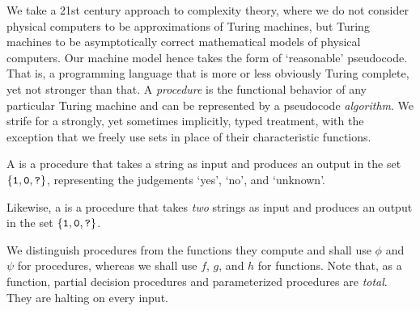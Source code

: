 We take a 21st century approach to complexity theory, where we do not consider physical computers to be approximations of Turing machines, but Turing machines to be asymptotically correct mathematical models of physical computers.
Our machine model hence takes the form of `reasonable' pseudocode.
That is, a programming language that is more or less obviously Turing complete, yet not stronger than that.
A \emph{procedure} is the functional behavior of any particular Turing machine and can be represented by a pseudocode \emph{algorithm}.
We strife for a strongly, yet sometimes implicitly, typed treatment, with the exception that we freely use sets in place of their characteristic functions.

\begin{definition}
  A  is a procedure that takes a string as input and produces an output in the set $\{\textnormal{\texttt{1}}, \textnormal{\texttt{0}}, \textnormal{\texttt{?}}\}$, representing the judgements `yes', `no', and `unknown'.

  Likewise, a  is a procedure that takes \emph{two} strings as input and produces an output in the set $\{\textnormal{\texttt{1}}, \textnormal{\texttt{0}}, \textnormal{\texttt{?}}\}$.
\end{definition}

We distinguish procedures from the functions they compute and shall use $\phi$ and $\psi$ for procedures, whereas we shall use $f$, $g$, and $h$ for functions. %
Note that, as a function, partial decision procedures and parameterized procedures are \emph{total}.
They are halting on every input.

